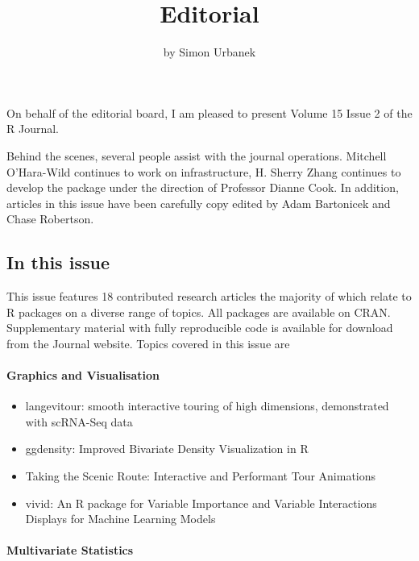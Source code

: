 \title{Editorial}


\author{by Simon Urbanek}

\maketitle


On behalf of the editorial board, I am pleased to present Volume 15 Issue 2 of the R Journal.

Behind the scenes, several people assist with the journal operations. Mitchell O'Hara-Wild continues to work on infrastructure, H. Sherry Zhang continues to develop the  package under the direction of Professor Dianne Cook. In addition, articles in this issue have been carefully copy edited by Adam Bartonicek and Chase Robertson.

\hypertarget{in-this-issue}{%
\subsection{In this issue}\label{in-this-issue}}

This issue features 18 contributed research articles the
majority of which relate to R packages on a diverse range of
topics. All packages are available on CRAN. Supplementary material
with fully reproducible code is available for download from the
Journal website. Topics covered in this issue are

\hypertarget{graphics-and-visualisation}{%
\paragraph{Graphics and Visualisation}\label{graphics-and-visualisation}}

\begin{itemize}
\tightlist
\item
  langevitour: smooth interactive touring of high dimensions, demonstrated with scRNA-Seq data
\item
  ggdensity: Improved Bivariate Density Visualization in R
\item
  Taking the Scenic Route: Interactive and Performant Tour Animations
\item
  vivid: An R package for Variable Importance and Variable Interactions Displays for Machine Learning Models
\end{itemize}

\hypertarget{multivariate-statistics}{%
\paragraph{Multivariate Statistics}\label{multivariate-statistics}}

